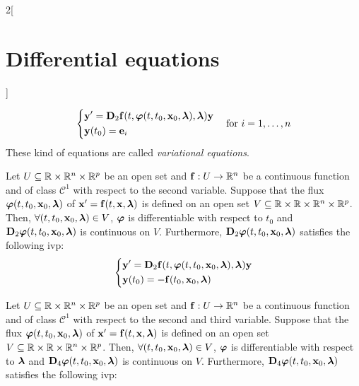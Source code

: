 \documentclass[../../../main.tex]{subfiles}
\begin{document}
\begin{multicols}{2}[\section{Differential equations}]
\begin{theorem}
    $$
      \left\{
      \begin{aligned}
         & \boldsymbol{\mathrm{y}}'      =\boldsymbol{\mathrm{D}}_2\boldsymbol{\mathrm{f}}(t,\boldsymbol{\mathrm{\varphi}}(t,t_0,\boldsymbol{\mathrm{x}}_0,\boldsymbol{\mathrm{\lambda}}),\boldsymbol{\mathrm{\lambda}})\boldsymbol{\mathrm{y}} \\
         & \boldsymbol{\mathrm{y}}(t_0)  =\boldsymbol{\mathrm{e}}_i
      \end{aligned}
      \right.\quad\text{for }i=1,\ldots,n
    $$
    These kind of equations are called \textit{variational equations}.
  \end{theorem}
  \begin{theorem}[Dependence on $t_0$]
    Let $U\subseteq\mathbb{R}\times\mathbb{R}^n\times\mathbb{R}^p$ be an open set and $\boldsymbol{\mathrm{f}}:U\rightarrow\mathbb{R}^n$ be a continuous function and of class $\mathcal{C}^1$ with respect to the second variable. Suppose that the flux $\boldsymbol{\mathrm{\varphi}}(t,t_0,\boldsymbol{\mathrm{x}}_0,\boldsymbol{\mathrm{\lambda}})$ of $\boldsymbol{\mathrm{x}}'=\boldsymbol{\mathrm{f}}(t,\boldsymbol{\mathrm{x}},\boldsymbol{\mathrm{\lambda}})$ is defined on an open set $V\subseteq\mathbb{R}\times\mathbb{R}\times\mathbb{R}^n\times\mathbb{R}^p$. Then, $\forall (t,t_0,\boldsymbol{\mathrm{x}}_0,\boldsymbol{\mathrm{\lambda}})\in V$, $\boldsymbol{\mathrm{\varphi}}$ is differentiable with respect to $t_0$ and $\boldsymbol{\mathrm{D}}_2\boldsymbol{\mathrm{\varphi}}(t,t_0,\boldsymbol{\mathrm{x}}_0,\boldsymbol{\mathrm{\lambda}})$ is continuous on $V$. Furthermore, $\boldsymbol{\mathrm{D}}_2\boldsymbol{\mathrm{\varphi}}(t,t_0,\boldsymbol{\mathrm{x}}_0,\boldsymbol{\mathrm{\lambda}})$ satisfies the following ivp:
    \begin{equation*}
      \left\{
      \begin{aligned}
         & \boldsymbol{\mathrm{y}}'      =\boldsymbol{\mathrm{D}}_2\boldsymbol{\mathrm{f}}(t,\boldsymbol{\mathrm{\varphi}}(t,t_0,\boldsymbol{\mathrm{x}}_0,\boldsymbol{\mathrm{\lambda}}),\boldsymbol{\mathrm{\lambda}})\boldsymbol{\mathrm{y}} \\
         & \boldsymbol{\mathrm{y}}(t_0)  = -\boldsymbol{\mathrm{f}}(t_0,\boldsymbol{\mathrm{x}}_0,\boldsymbol{\mathrm{\lambda}})
      \end{aligned}
      \right.
    \end{equation*}
  \end{theorem}
  \begin{theorem}
    Let $U\subseteq\mathbb{R}\times\mathbb{R}^n\times\mathbb{R}^p$ be an open set and $\boldsymbol{\mathrm{f}}:U\rightarrow\mathbb{R}^n$ be a continuous function and of class $\mathcal{C}^1$ with respect to the second and third variable. Suppose that the flux $\boldsymbol{\mathrm{\varphi}}(t,t_0,\boldsymbol{\mathrm{x}}_0,\boldsymbol{\mathrm{\lambda}})$ of $\boldsymbol{\mathrm{x}}'=\boldsymbol{\mathrm{f}}(t,\boldsymbol{\mathrm{x}},\boldsymbol{\mathrm{\lambda}})$ is defined on an open set $V\subseteq\mathbb{R}\times\mathbb{R}\times\mathbb{R}^n\times\mathbb{R}^p$. Then, $\forall (t,t_0,\boldsymbol{\mathrm{x}}_0,\boldsymbol{\mathrm{\lambda}})\in V$, $\boldsymbol{\mathrm{\varphi}}$ is differentiable with respect to $\boldsymbol{\mathrm{\lambda}}$ and $\boldsymbol{\mathrm{D}}_4\boldsymbol{\mathrm{\varphi}}(t,t_0,\boldsymbol{\mathrm{x}}_0,\boldsymbol{\mathrm{\lambda}})$ is continuous on $V$. Furthermore, $\boldsymbol{\mathrm{D}}_4\boldsymbol{\mathrm{\varphi}}(t,t_0,\boldsymbol{\mathrm{x}}_0,\boldsymbol{\mathrm{\lambda}})$ satisfies the following ivp:

\end{theorem}
\end{multicols}
\end{document}
